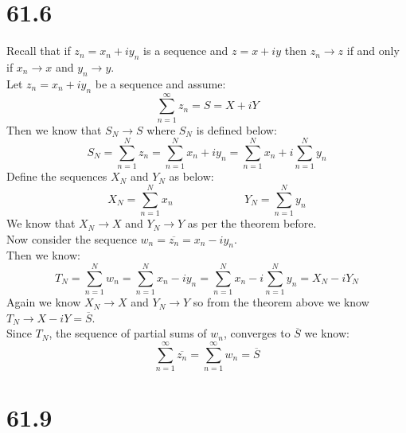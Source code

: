 \documentclass{article}
\begin{document}
\section*{61.6}
\begin{center}
    \doublespacing
    Recall that if $z_n = x_n + iy_n$ is a sequence and $z = x + iy$ then $z_n\rightarrow z$ if and only if $x_n\rightarrow x$ and $y_n\rightarrow y$.
    \\Let $z_n = x_n + iy_n$ be a sequence and assume:
    \[\sum _{n=1}^{\infty} z_n = S = X + iY\]
    Then we know that $S_N\rightarrow S$ where $S_N$ is defined below:
    \[S_N =\sum _{n=1}^N z_n =\sum _{n=1}^N x_n + iy_n =\sum _{n=1}^N x_n + i\sum _{n=1}^N y_n\]
    Define the sequences $X_N$ and $Y_N$ as below:
    \[X_N =\sum _{n=1}^N x_n\;\;\;\;\;\;\;\;\;\;\;\;\;\;\;\;\;\;\;\;\;\;\;Y_N =\sum _{n=1}^N y_n\]
    We know that $X_N\rightarrow X$ and $Y_N\rightarrow Y$ as per the theorem before.
    \\Now consider the sequence $w_n =\overline{z_n} = x_n - iy_n$.
    \\Then we know:
    \[T_N =\sum _{n=1}^N w_n =\sum _{n=1}^N x_n - iy_n =\sum _{n=1}^N x_n - i\sum _{n=1}^N y_n = X_N - iY_N\]
    Again we know $X_N\rightarrow X$ and $Y_N\rightarrow Y$ so from the theorem above we know $T_N\rightarrow X - iY =\overline{S}$.
    \\Since $T_N$, the sequence of partial sums of $w_n$, converges to $\overline{S}$ we know:
    \[\sum _{n=1}^{\infty}\overline{z_n} =\sum _{n=1}^{\infty} w_n =\overline{S}\]
    \qedsymbol
\end{center}


\newpage
\section*{61.9}
\end{document}
